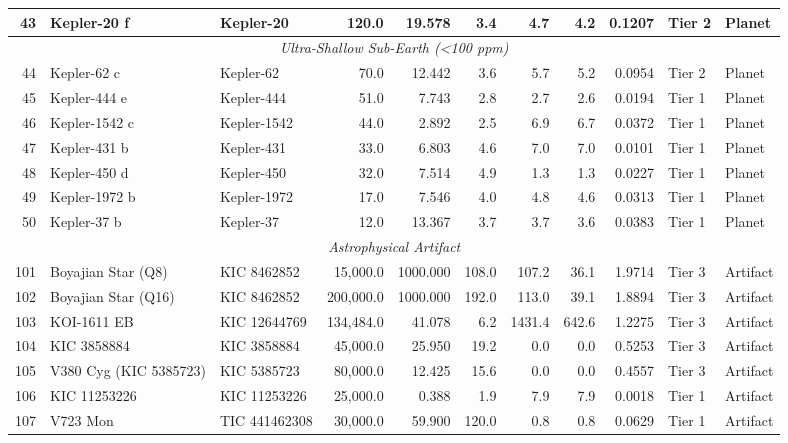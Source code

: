 \begin{longtable}{r l l r r r r r r l l}
43 & Kepler-20 f      & Kepler-20    &     120.0 &  19.578 &   3.4 &    4.7 &    4.2 &  0.1207 & Tier 2  & Planet \\
\hline
\multicolumn{11}{c}{\textit{Ultra-Shallow Sub-Earth (<100 ppm)}} \\
\hline
44 & Kepler-62 c      & Kepler-62    &      70.0 &  12.442 &   3.6 &    5.7 &    5.2 &  0.0954 & Tier 2  & Planet \\
45 & Kepler-444 e     & Kepler-444   &      51.0 &   7.743 &   2.8 &    2.7 &    2.6 &  0.0194 & Tier 1  & Planet \\
46 & Kepler-1542 c    & Kepler-1542  &      44.0 &   2.892 &   2.5 &    6.9 &    6.7 &  0.0372 & Tier 1  & Planet \\
47 & Kepler-431 b     & Kepler-431   &      33.0 &   6.803 &   4.6 &    7.0 &    7.0 &  0.0101 & Tier 1  & Planet \\
48 & Kepler-450 d     & Kepler-450   &      32.0 &   7.514 &   4.9 &    1.3 &    1.3 &  0.0227 & Tier 1  & Planet \\
49 & Kepler-1972 b    & Kepler-1972  &      17.0 &   7.546 &   4.0 &    4.8 &    4.6 &  0.0313 & Tier 1  & Planet \\
50 & Kepler-37 b      & Kepler-37    &      12.0 &  13.367 &   3.7 &    3.7 &    3.6 &  0.0383 & Tier 1  & Planet \\
\hline
\multicolumn{11}{c}{\textit{Astrophysical Artifact}} \\
\hline
101 & Boyajian Star (Q8) & KIC 8462852  &  15,000.0 & 1000.000 & 108.0 &  107.2 &   36.1 &  1.9714 & Tier 3  & Artifact \\
102 & Boyajian Star (Q16) & KIC 8462852  & 200,000.0 & 1000.000 & 192.0 &  113.0 &   39.1 &  1.8894 & Tier 3  & Artifact \\
103 & KOI-1611 EB      & KIC 12644769 & 134,484.0 &  41.078 &   6.2 & 1431.4 &  642.6 &  1.2275 & Tier 3  & Artifact \\
104 & KIC 3858884      & KIC 3858884  &  45,000.0 &  25.950 &  19.2 &    0.0 &    0.0 &  0.5253 & Tier 3  & Artifact \\
105 & V380 Cyg (KIC 5385723) & KIC 5385723  &  80,000.0 &  12.425 &  15.6 &    0.0 &    0.0 &  0.4557 & Tier 3  & Artifact \\
106 & KIC 11253226     & KIC 11253226 &  25,000.0 &   0.388 &   1.9 &    7.9 &    7.9 &  0.0018 & Tier 1  & Artifact \\
107 & V723 Mon         & TIC 441462308 &  30,000.0 &  59.900 & 120.0 &    0.8 &    0.8 &  0.0629 & Tier 1  & Artifact \\
\hline\hline
\end{longtable}
